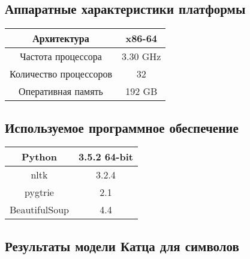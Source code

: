 
\appendix
{}
\renewcommand{\thesection}{\Asbuk{section}}


\singlespace

\subsection{ Аппаратные характеристики платформы }

\label{appendix:specs}

\begin{table}[H]
	\begin{center}
\begin{tabular}{|c|c|}\hline
	Архитектура            & x86-64   \\ \hline
	Частота процессора     & 3.30 GHz \\ \hline
	Количество процессоров & 32       \\ \hline
	Оперативная память     & 192 GB \\  \hline
\end {tabular}
\end{center}
\end{table}

\subsection{ Используемое программное обеспечение }
\begin{table}[H]
	\begin{center}
\begin{tabular}{|c|c|} \hline
	Python            &  3.5.2 64-bit  \\ \hline
	nltk &  3.2.4 \\\hline
	pygtrie & 2.1 \\\hline
	BeautifulSoup & 4.4 \\ \hline
\end {tabular}\end{center}
\end{table}

\renewcommand{\thesection}{\Asbuk{section}}

\subsection{ Результаты модели Катца для символов }

